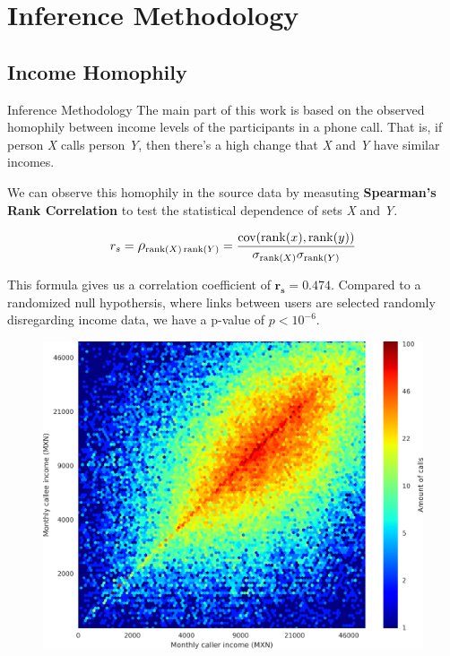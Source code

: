 \documentclass{beamer}
\begin{document}
\section{Inference Methodology}
\subsection{Income Homophily}

\begin{frame}{Inference Methodology}
The main part of this work is based on the observed homophily between income levels of the participants in a phone call. That is, if person \emph{X} calls person \emph{Y}, then there's a high change that \emph{X} and \emph{Y} have similar incomes.
	
We can observe this homophily in the source data by measuting \textbf{Spearman's Rank Correlation} to test the statistical dependence of sets \emph{X} and \emph{Y}.

\[
	r_s = \mathlarger{\rho}_{\operatorname{rank}(X) \operatorname{rank}(Y)} = \frac{\operatorname{cov}(\operatorname{rank}(x), \operatorname{rank}(y))}{\sigma_{\operatorname{rank}(X)} \sigma_{\operatorname{rank}(Y)}}
\]

This formula gives us a correlation coefficient of \( \mathbf{r_s = 0.474} \). Compared to a randomized null hypothersis, where links between users are selected randomly disregarding income data, we have a p-value of \( p < 10^{-6} \).

\end{frame}
\begin{frame}

\begin{figure}[h]
	\begin{center}
		{\includegraphics[height=0.6\textheight]
		{../figures/Homophily_income_origin_target_1/Homophily_income_origin_target_1.png}
		}\label{homophily_heatmap}
	\end{center}
\end{figure}

\end{frame}
\end{document}
